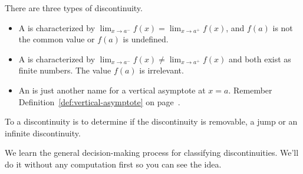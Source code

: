 \documentclass[../main.tex]{subfiles}
\begin{document}
\begin{definition} \label{def:discontinuities}
  There are three types of discontinuity.

  \begin{itemize}[itemsep={3ex}]
    \item A  is characterized by \(\lim_{x \to a^{-}} f(x) = \lim_{x \to a^{+}}f(x)\), and \(f(a)\) is not the common value or \(f(a)\) is undefined.

      \begin{center}
        
      \end{center}

    \item A  is characterized by \(\lim_{x \to a^{-}} f(x) \ne \lim_{x \to a^{+}}f(x)\) and both exist as finite numbers. The value \(f(a)\) is irrelevant.

      \begin{center}
        
      \end{center}

    \item An  is just another name for a vertical asymptote at \(x = a\). Remember Definition~\ref{def:vertical-asymptote} on page~\pageref{def:vertical-asymptote}.

      \begin{center}
        
      \end{center}
  \end{itemize}
  \vspace{3ex}
\end{definition}

\clearpage

\label{technique:classify-discontinuities}
To  a discontinuity is to determine if the discontinuity is removable, a jump or an infinite discontinuity.

\begin{center}
  
\end{center}

We learn the general decision-making process for classifying discontinuities. We'll do it without any computation first so you can see the idea.
\end{document}
